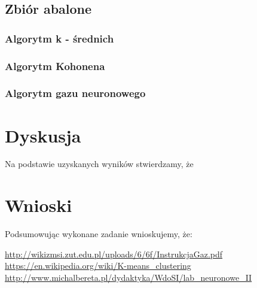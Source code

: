 \documentclass{classrep}
\begin{document}
{{{		}
	}
	\subsection{Zbiór abalone}
	{
		\subsubsection{Algorytm k - średnich}
		{

		}

		\subsubsection{Algorytm Kohonena}
		{

		}

		\subsubsection{Algorytm gazu neuronowego}
		{

		}
	}
}

\section{Dyskusja}
{
	Na podstawie uzyskanych wyników stwierdzamy, że
}

\section{Wnioski}
{
	Podsumowując wykonane zadanie wnioskujemy, że:\\
}

\begin{thebibliography}{0}
  \url{ http://wikizmsi.zut.edu.pl/uploads/6/6f/InstrukcjaGaz.pdf}
   \url{https://en.wikipedia.org/wiki/K-means\_clustering}
   \url{http://www.michalbereta.pl/dydaktyka/WdoSI/lab_neuronowe_II}
\end{thebibliography}

{

}
\end{document}
